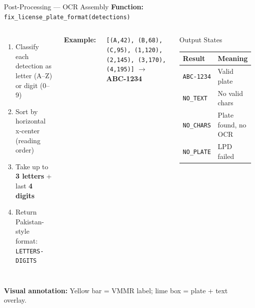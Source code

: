 \documentclass[aspectratio=169,11pt]{beamer}
\begin{document}
\begin{frame}{Post-Processing --- OCR Assembly}
  \textbf{Function:} \texttt{fix\_license\_plate\_format(detections)}
  \vspace{0.3em}

  \begin{columns}[T]
    \begin{enumerate}
      \item Classify each detection as letter (A--Z) or digit (0--9)
      \item Sort by horizontal x-center (reading order)
      \item Take up to \textbf{3 letters} + last \textbf{4 digits}
      \item Return Pakistan-style format: \texttt{LETTERS-DIGITS}
    \end{enumerate}
    \textbf{Example:}
    \begin{center}
      \texttt{[(A,42), (B,68), (C,95), (1,120), (2,145), (3,170), (4,195)]}
      $\rightarrow$ \textbf{ABC-1234}
    \end{center}
    \begin{block}{Output States}
      \begin{tabular}{@{}ll@{}}
        \toprule
        \textbf{Result} & \textbf{Meaning} \\
        \midrule
        \texttt{ABC-1234} & Valid plate \\
        \texttt{NO\_TEXT} & No valid chars \\
        \texttt{NO\_CHARS} & Plate found, no OCR \\
        \texttt{NO\_PLATE} & LPD failed \\
        \bottomrule
      \end{tabular}
    \end{block}
  \end{columns}
  \vspace{0.3em}
  \textbf{Visual annotation:} Yellow bar = VMMR label; lime box = plate + text overlay.
\end{frame}
\end{document}
